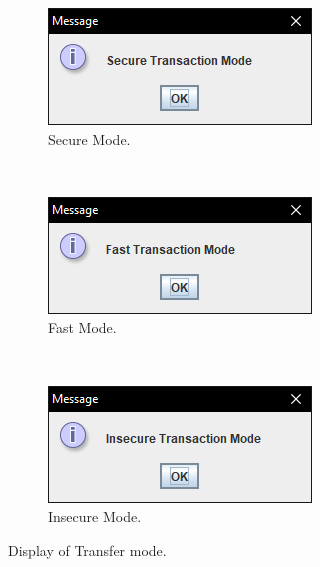 \documentclass[12pt,twocolumn]{IEEEtran}
\begin{document}
\begin{figure}[h!]
	\centering
	\begin{subfigure}[t]{0.32\textwidth}
		\centering
		\includegraphics[width=\linewidth]{./Resources/showSecureMode.PNG}
		\caption{Secure Mode.}
	\end{subfigure}%
	~ 
	\begin{subfigure}[t]{0.32\textwidth}
		\centering
		\includegraphics[width=\linewidth]{./Resources/showFastMode.PNG}
		\caption{Fast Mode.}
	\end{subfigure}
	~ 
	\begin{subfigure}[t]{0.32\textwidth}
		\centering
		\includegraphics[width=\linewidth]{./Resources/showInsecureMode.PNG}
		\caption{Insecure Mode.}
	\end{subfigure}
	\caption{Display of Transfer mode.} \label{fig:mode}
\end{figure}
\end{document}
